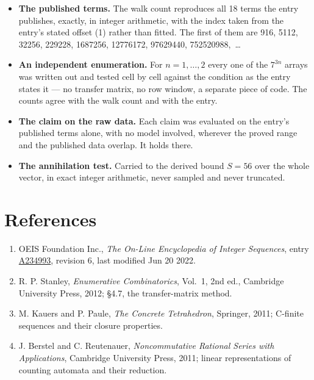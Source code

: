 \documentclass[11pt]{article}
\theoremstyle{definition}
\begin{document}
\begin{itemize}

\item {\bfseries The published terms.} The walk count reproduces all 18 terms the entry publishes, exactly, in integer arithmetic, with the index taken from the entry's stated offset (1) rather than fitted. The first of them are 916, 5112, 32256, 229228, 1687256, 12776172, 97629440, 752520988,~\dots

\item {\bfseries An independent enumeration.} For $n = 1,\dots,2$ every one of the $7^{3n}$ arrays was written out and tested cell by cell against the condition as the entry states it --- no transfer matrix, no row window, a separate piece of code. The counts agree with the walk count and with the entry.

\item {\bfseries The claim on the raw data.} Each claim was evaluated on the entry's published terms alone, with no model involved, wherever the proved range and the published data overlap. It holds there.

\item {\bfseries The annihilation test.} Carried to the derived bound $S = 56$ over the whole vector, in exact integer arithmetic, never sampled and never truncated.

\end{itemize}

\section{References}

\begin{enumerate}

\item OEIS Foundation Inc., \emph{The On-Line Encyclopedia of Integer Sequences}, entry \href{https://oeis.org/A234993}{A234993}, revision 6, last modified Jun 20 2022.

\item R. P. Stanley, \emph{Enumerative Combinatorics}, Vol.~1, 2nd ed., Cambridge University Press, 2012; \S4.7, the transfer-matrix method.

\item M. Kauers and P. Paule, \emph{The Concrete Tetrahedron}, Springer, 2011; C-finite sequences and their closure properties.

\item J. Berstel and C. Reutenauer, \emph{Noncommutative Rational Series with Applications}, Cambridge University Press, 2011; linear representations of counting automata and their reduction.

\end{enumerate}
\end{document}
